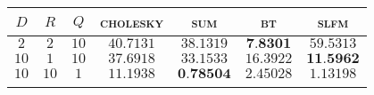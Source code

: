 
\begin{tabular}{|ccc|cccc|}
  \hline
  \abovespace\belowspace
  $D$ & $R$ & $Q$ & \textsc{cholesky} & \textsc{sum} & \textsc{bt} & \textsc{slfm}\\
\hline
  \abovespace
 $ 2 $ & $ 2 $ & $ 10 $ & $ 40.7131 $ & $ 38.1319 $ & $ \textbf{7.8301} $ & $ 59.5313 $ \\ 
 $ 10 $ & $ 1 $ & $ 10 $ & $ 37.6918 $ & $ 33.1533 $ & $ 16.3922 $ & $ \textbf{11.5962} $ \\ 
 $ 10 $ & $ 10 $ & $ 1 $ & $ 11.1938 $ & $ \textbf{0.78504} $ & $ 2.45028 $ & $ 1.13198 $ \\ 

  \belowspace \\

  \hline
\end{tabular}

